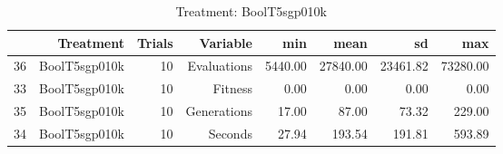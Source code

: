 \begin{table}[ht]
\centering
\begin{tabular}{rrrrrrrr}
  \hline
 & Treatment & Trials & Variable & min & mean & sd & max \\ 
  \hline
36 & BoolT5sgp010k &  10 & Evaluations & 5440.00 & 27840.00 & 23461.82 & 73280.00 \\ 
  33 & BoolT5sgp010k &  10 & Fitness & 0.00 & 0.00 & 0.00 & 0.00 \\ 
  35 & BoolT5sgp010k &  10 & Generations & 17.00 & 87.00 & 73.32 & 229.00 \\ 
  34 & BoolT5sgp010k &  10 & Seconds & 27.94 & 193.54 & 191.81 & 593.89 \\ 
   \hline
\end{tabular}
\caption{Treatment: BoolT5sgp010k} 
\end{table}
